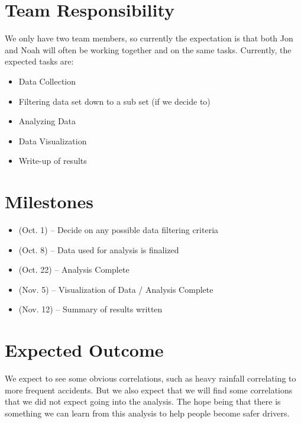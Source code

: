\documentclass[letterpaper, 10 pt, conference]{ieeeconf}  %
\begin{document}
\section{Team Responsibility}

We only have two team members, so currently the expectation is that both Jon and Noah will often be working together and on the same tasks.  Currently, the expected tasks are:

\begin{itemize}

\item Data Collection
\item Filtering data set down to a sub set (if we decide to)
\item Analyzing Data
\item Data Visualization
\item Write-up of results

\end{itemize}

\newpage

\section{Milestones}

\begin{itemize}
    \item (Oct. 1) -- Decide on any possible data filtering criteria
    \item (Oct. 8) -- Data used for analysis is finalized
    \item (Oct. 22) -- Analysis Complete
    \item (Nov. 5) -- Visualization of Data / Analysis Complete
    \item (Nov. 12) -- Summary of results written
\end{itemize}

\section{Expected Outcome}
We expect to see some obvious correlations, such as heavy rainfall correlating to more frequent accidents.  But we also expect that we will find some correlations that we did not expect going into the analysis.  The hope being that there is something we can learn from this analysis to help people become safer drivers.

\addtolength{\textheight}{-12cm}   %

\end{document}

